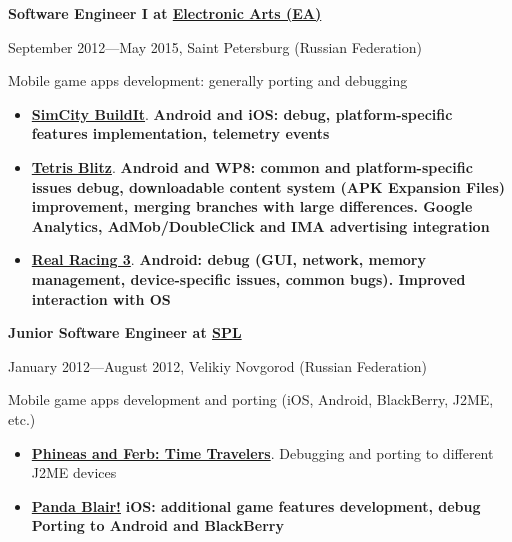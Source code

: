 {
\fontsize{12pt}{12pt}\selectfont
\bfseries Software Engineer I at
\href{http://www.ea.com}{Electronic Arts (EA)}
\mdseries
}

{
\fontsize{9pt}{8pt}\selectfont
September 2012---May 2015, Saint Petersburg (Russian Federation)
}

\subitem Mobile game apps development: generally porting and debugging
\begin{itemize}
\setlength{\itemindent}{20pt}
\item
    \href{http://www.ea.com/simcity-buildit}
        {\bfseries SimCity BuildIt\mdseries}.
        \bfseries Android \mdseries and \bfseries iOS\mdseries:
        debug,
        platform-specific features implementation,
        telemetry events
\item
    \href{http://www.tetrisblitz.com}
        {\bfseries Tetris Blitz\mdseries}.
        \bfseries Android \mdseries and \bfseries WP8\mdseries:
        common and platform-specific issues debug,
        downloadable content system (APK Expansion Files) improvement,
        merging branches with large differences.
        Google Analytics, AdMob/DoubleClick and IMA advertising integration
\item
    \href{http://www.ea.com/real-racing-3}
    {\bfseries Real Racing 3\mdseries}.
        \bfseries Android\mdseries:
        debug (GUI, network, memory management, device-specific issues, common bugs).
        Improved interaction with OS
\end{itemize}

\vspace{5pt}

{
\fontsize{12pt}{12pt}\selectfont
\bfseries Junior Software Engineer at
\href{http://spl.co}{\bfseries SPL\mdseries}
\mdseries
}

{
\fontsize{9pt}{8pt}\selectfont
January 2012---August 2012, Velikiy Novgorod (Russian Federation)
}

Mobile game apps development and porting
(iOS, Android, BlackBerry, J2ME, etc.)

\begin{itemize}

\setlength{\itemindent}{20pt}
\item
    \href{http://java.mob.org/game/phineas\_and\_ferb\_time\_travelers.html}
        {\bfseries Phineas and Ferb: Time Travelers\mdseries}.
        Debugging and porting to different J2ME devices
\item
    \href{https://itunes.apple.com/us/app/panda-blair!/id500995558?mt=8}
        {\bfseries Panda Blair!\mdseries}
        \bfseries iOS\mdseries: additional game features development, debug
        Porting to \bfseries Android \mdseries and \bfseries BlackBerry\mdseries
\end{itemize}

